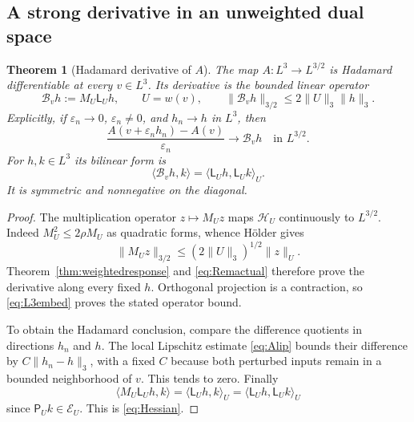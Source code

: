 \documentclass[11pt,a4paper]{article}
\newtheorem{theorem}{Theorem}[section]
\theoremstyle{definition}\newtheorem{definition}[theorem]{Definition}
\theoremstyle{remark}\newtheorem{remark}[theorem]{Remark}
\newcommand{\HH}{\mathcal H}
\newcommand{\GG}{\mathcal E}
\newcommand{\LP}{\mathsf L}
\newcommand{\GP}{\mathsf P}
\newcommand{\norm}[1]{\lVert #1\rVert}
\newcommand{\ip}[2]{\langle #1,#2\rangle}
\numberwithin{equation}{section}
\begin{document}
\subsection{A strong derivative in an unweighted dual space}
\begin{theorem}[Hadamard derivative of $A$]\label{thm:Aderivative}
The map $A:L^3\to L^{3/2}$ is Hadamard differentiable at every $v\in L^3$. Its derivative is the bounded linear operator
\begin{equation}\label{eq:Aderivative}
 \mathcal B_v h:=M_U\LP_Uh,\qquad U=w(v),
 \qquad \norm{\mathcal B_vh}_{3/2}\le2\norm U_3\norm h_3.
\end{equation}
Explicitly, if $\varepsilon_n\to0$, $\varepsilon_n\ne0$, and $h_n\to h$ in $L^3$, then
\[
 \frac{A(v+\varepsilon_nh_n)-A(v)}{\varepsilon_n}
 \longrightarrow\mathcal B_vh\quad\text{in }L^{3/2}.
\]
For $h,k\in L^3$ its bilinear form is
\begin{equation}\label{eq:Hessian}
 \ip{\mathcal B_vh}k=\ip{\LP_Uh}{\LP_Uk}_U.
\end{equation}
It is symmetric and nonnegative on the diagonal.
\end{theorem}
\begin{proof}
The multiplication operator $z\mapsto M_Uz$ maps $\HH_U$ continuously to $L^{3/2}$. Indeed $M_U^2\le2\rho M_U$ as quadratic forms, whence H\"older gives
\[
 \norm{M_Uz}_{3/2}
 \le(2\norm U_3)^{1/2}\norm z_U.
\]
Theorem~\ref{thm:weightedresponse} and \eqref{eq:Remactual} therefore prove the derivative along every fixed $h$. Orthogonal projection is a contraction, so \eqref{eq:L3embed} proves the stated operator bound.

To obtain the Hadamard conclusion, compare the difference quotients in directions $h_n$ and $h$. The local Lipschitz estimate \eqref{eq:Alip} bounds their difference by $C\norm{h_n-h}_3$, with a fixed $C$ because both perturbed inputs remain in a bounded neighborhood of $v$. This tends to zero. Finally
\[
 \ip{M_U\LP_Uh}k=\ip{\LP_Uh}k_U
 =\ip{\LP_Uh}{\LP_Uk}_U
\]
since $\GP_Uk\in\GG_U$. This is \eqref{eq:Hessian}.
\end{proof}
\end{document}
